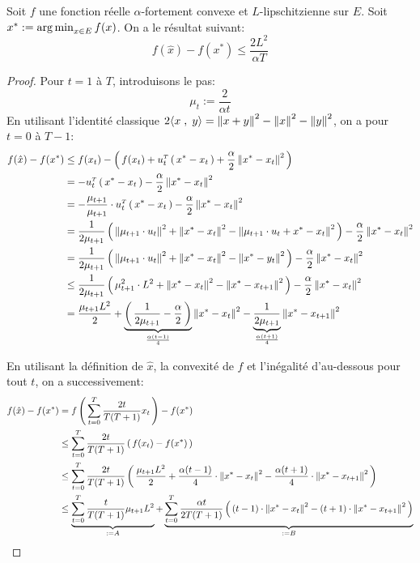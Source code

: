 \begin{theorem}

Soit $f$ une fonction réelle $\alpha$-fortement convexe et $L$-lipschitzienne sur
$E$. Soit $x^{*}:= \operatorname*{arg\,min}_{x\in E} f(x)$. On a le résultat suivant:
\begin{equation}
f(\hat{x})-f(x^{*}) \leq \frac{2 L^2}{\alpha T}
\end{equation}
\end{theorem}

\begin{proof}
Pour $t=1$ à $T$, introduisons le pas:
\begin{equation}
  \mu_t := \frac{2}{\alpha t}
\end{equation}
En utilisant l'identité classique $2\ps{x}{y} = \norme{x+y}^2-\norme{x}^2-\norme{y}^2$, on a pour $t=0$ à $T-1$:
\begin{align*}
f(\hat{x})-f(x^{*}) &\leq f(x_t)-\prt{f(x_t) + \transpose{u_t}\prt{x^{*}-x_t}
+ \frac{\alpha}{2} \norme{x^{*}-x_t}^2}\\
&= -\transpose{u_t}\prt{x^{*}-x_t}
- \frac{\alpha}{2} \norme{x^{*}-x_t}^2\\
&= -\frac{\mu_{t+1}}{\mu_{t+1}} \cdot \transpose{u_t}\prt{x^{*}-x_t}
- \frac{\alpha}{2} \norme{x^{*}-x_t}^2\\
&= \frac{1}{2 \mu_{t+1} }\prt{\norme{\mu_{t+1} \cdot u_t}^2+\norme{x^{*}-x_t}^2-\norme{\mu_{t+1} \cdot u_t+x^{*}-x_t}^2
}- \frac{\alpha}{2} \norme{x^{*}-x_t}^2\\
&= \frac{1}{2 \mu_{t+1} }\prt{\norme{\mu_{t+1} \cdot u_t}^2+\norme{x^{*}-x_t}^2-\norme{ x^{*}-y_t}^2
}- \frac{\alpha}{2} \norme{x^{*}-x_t}^2\\
&\leq  \frac{1}{2 \mu_{t+1} }\prt{\mu_{t+1}^2\cdot L^2+\norme{x^{*}-x_t}^2-\norme{x^{*}-x_{t+1}}^2
}- \frac{\alpha}{2} \norme{x^{*}-x_t}^2\\
&= \frac{\mu_{t+1} L^2}{2} + \underbrace{\prt{\frac{1}{2 \mu_{t+1} } - \frac{\alpha}{2}}}_{\frac{\alpha (t-1)}{4}} \norme{x^{*}-x_t}^2
- \underbrace{\frac{1}{2 \mu_{t+1} }}_{\frac{\alpha (t+1)}{4}} \norme{x^{*}-x_{t+1}}^2
\end{align*}

En utilisant la définition de $\hat{x}$, la convexité de $f$ et l'inégalité d'au-dessous pour tout $t$, on a successivement:
\begin{align*}
  f(\hat{x})-f(x^{*}) &= f\prt{\sum_{t=0}^T \frac{2t}{T(T+1)} x_t}-f(x^{*})\\
  &\leq  \sum_{t=0}^T \frac{2t}{T(T+1)} \prt{f(x_t)-f(x^{*})}\\
  &\leq  \sum_{t=0}^T \frac{2t}{T(T+1)} \prt{\frac{\mu_{t+1} L^2}{2}+\frac{\alpha (t-1)}{4} \cdot \norme{x^{*}-x_t}^2-\frac{\alpha (t+1)}{4} \cdot  \norme{x^{*}-x_{t+1}}^2}\\
  &\leq  \underbrace{\sum_{t=0}^T \frac{t}{T(T+1)} \mu_{t+1} L^2}_{:=A}+\underbrace{\sum_{t=0}^T \frac{\alpha t}{2T(T+1)}  \prt{(t-1) \cdot \norme{x^{*}-x_t}^2-(t+1) \cdot  \norme{x^{*}-x_{t+1}}^2}}_{:=B}\\
\end{align*}


\end{proof}
